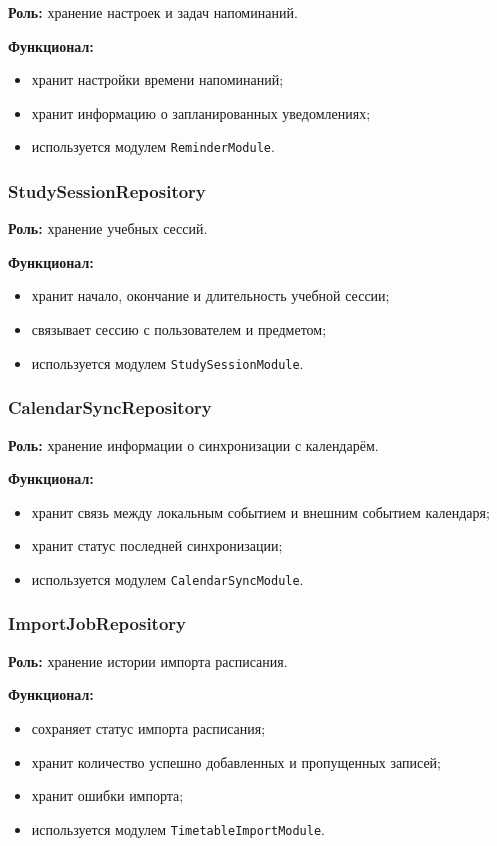 \documentclass[10pt,a4paper,final]{article} %
\begin{document}
\textbf{Роль:} хранение настроек и задач напоминаний.

\textbf{Функционал:}
\begin{itemize}
    \item хранит настройки времени напоминаний;
    \item хранит информацию о запланированных уведомлениях;
    \item используется модулем \texttt{ReminderModule}.
\end{itemize}

\subsubsection{StudySessionRepository}

\textbf{Роль:} хранение учебных сессий.

\textbf{Функционал:}
\begin{itemize}
    \item хранит начало, окончание и длительность учебной сессии;
    \item связывает сессию с пользователем и предметом;
    \item используется модулем \texttt{StudySessionModule}.
\end{itemize}

\subsubsection{CalendarSyncRepository}

\textbf{Роль:} хранение информации о синхронизации с календарём.

\textbf{Функционал:}
\begin{itemize}
    \item хранит связь между локальным событием и внешним событием календаря;
    \item хранит статус последней синхронизации;
    \item используется модулем \texttt{CalendarSyncModule}.
\end{itemize}

\subsubsection{ImportJobRepository}

\textbf{Роль:} хранение истории импорта расписания.

\textbf{Функционал:}
\begin{itemize}
    \item сохраняет статус импорта расписания;
    \item хранит количество успешно добавленных и пропущенных записей;
    \item хранит ошибки импорта;
    \item используется модулем \texttt{TimetableImportModule}.
\end{itemize}
\end{document}
